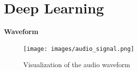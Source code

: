 \section{Deep Learning}
 

\paragraph{Waveform}


\begin{figure}[h] %
    \centering %
    \texttt{[image: images/audio\_signal.png]}
    \caption{Visualization of the audio waveform} %
    \label{fig:audiosignal} %
\end{figure}

